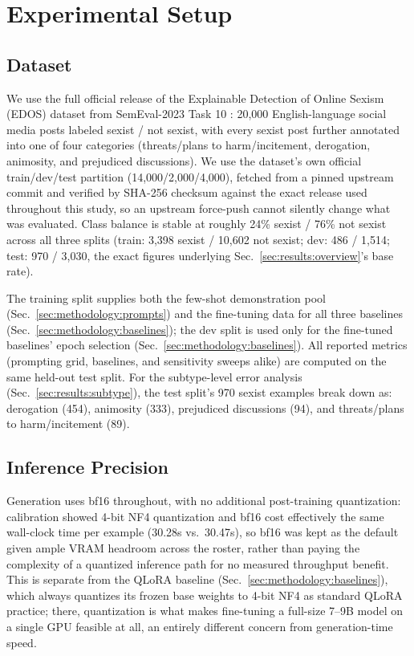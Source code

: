 \section{Experimental Setup}
\label{sec:experimental}

\subsection{Dataset}
\label{sec:experimental:dataset}

We use the full official release of the Explainable Detection of Online
Sexism (EDOS) dataset from SemEval-2023 Task 10 \cite{kirk2023semeval}:
20,000 English-language social media posts labeled sexist / not sexist,
with every sexist post further annotated into one of four categories
(threats/plans to harm/incitement, derogation, animosity, and prejudiced
discussions). We use the dataset's own official train/dev/test partition
(14,000/2,000/4,000), fetched from a pinned upstream commit and verified
by SHA-256 checksum against the exact release used throughout this study,
so an upstream force-push cannot silently change what was evaluated.
Class balance is stable at roughly 24\% sexist / 76\% not sexist across
all three splits (train: 3,398 sexist / 10,602 not sexist; dev: 486 / 1,514;
test: 970 / 3,030, the exact figures underlying
Sec.~\ref{sec:results:overview}'s base rate).

The training split supplies both the few-shot demonstration pool
(Sec.~\ref{sec:methodology:prompts}) and the fine-tuning data for all
three baselines (Sec.~\ref{sec:methodology:baselines}); the dev split is
used only for the fine-tuned baselines' epoch selection
(Sec.~\ref{sec:methodology:baselines}). All reported metrics (prompting
grid, baselines, and sensitivity sweeps alike) are computed on the same
held-out test split. For the subtype-level error analysis
(Sec.~\ref{sec:results:subtype}), the test split's 970 sexist examples
break down as: derogation (454), animosity (333), prejudiced discussions
(94), and threats/plans to harm/incitement (89).

\subsection{Inference Precision}
\label{sec:experimental:precision}

Generation uses bf16 throughout, with no additional post-training
quantization: calibration showed 4-bit NF4 quantization and bf16 cost
effectively the same wall-clock time per example (30.28s vs.\ 30.47s), so
bf16 was kept as the default given ample VRAM headroom across the
roster, rather than paying the complexity of a quantized inference path
for no measured throughput benefit. This is separate from the QLoRA
baseline (Sec.~\ref{sec:methodology:baselines}), which always quantizes
its frozen base weights to 4-bit NF4 as standard QLoRA practice; there,
quantization is what makes fine-tuning a full-size 7--9B model on a
single GPU feasible at all, an entirely different concern from
generation-time speed.

